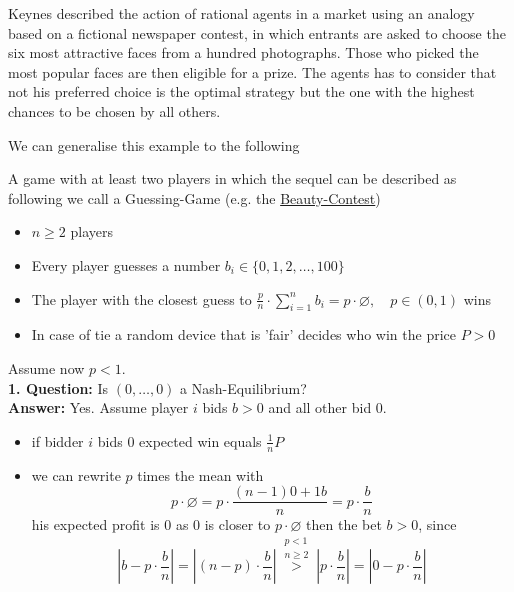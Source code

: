 \begin{example}  \label{Beauty-Contest}
Keynes described the action of rational agents in a market using an analogy based on a fictional newspaper contest, in which entrants are asked to choose the six most attractive faces from a hundred photographs. Those who picked the most popular faces are then eligible for a prize. The agents has to consider that not his preferred choice is the optimal strategy but the one with the highest chances to be chosen by all others.
\end{example}
We can generalise this example to the following \\
\begin{example}  \label{Guessing-Game}
	A game with at least two players in which the sequel can be described as following we call a Guessing-Game (e.g. the \hyperref[Beauty-Contest]{Beauty-Contest})
	\begin{itemize}
		\item $n \geq 2$ players
		\item Every player guesses a number $b_{i} \in \{0, 1, 2, \dotsc, 100 \}$
		\item The player with the closest guess to $\frac{p}{n} \cdot \sum_{i = 1}^{n} b_{i} = p \cdot \varnothing, \quad p \in (0, 1)$ wins
		\item In case of tie a random device that is 'fair' decides who win the price $P > 0$
	\end{itemize}
	Assume now $p < 1$. \\
	\textbf{1. Question:} Is $(0, \dotsc, 0)$ a Nash-Equilibrium? \\
	\textbf{Answer:} Yes. Assume player $i$ bids $b > 0$ and all other bid $0$.	
		\begin{itemize}
			\item if bidder $i$ bids $0$ expected win equals $\frac{1}{n} P $
			\item we can rewrite $p$ times the mean with	
				\[ p \cdot \varnothing = p \cdot \frac{(n - 1)0 + 1 b}{n} = p \cdot \frac{b}{n} \]
			his expected profit is $0$ as $0$ is closer to $p \cdot \varnothing$ then the bet $b > 0$, since
			\[ \left| b - p \cdot \frac{b}{n} \right| =  \left|(n-p) \cdot \frac{b}{n} \right| \overset{\substack{p < 1 \\ n \geq 2}}{>} \left| p \cdot \frac{b}{n} \right| = \left| 0 - p \cdot \frac{b}{n} \right| \]
		\end{itemize}
	

\end{example}
